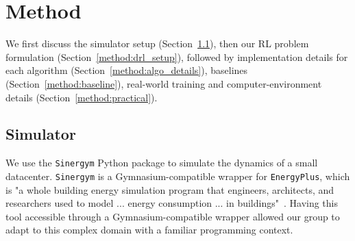\documentclass[12pt]{article}
\begin{document}


\section{Method}

We first discuss the simulator setup (Section~\ref{method:sim}), then our RL problem formulation (Section~\ref{method:drl_setup}), followed by implementation details for each algorithm (Section~\ref{method:algo_details}), baselines (Section~\ref{method:baseline}), real-world training and computer-environment details (Section~\ref{method:practical}).

\subsection{Simulator}\label{method:sim}
We use the \texttt{Sinergym} Python package to simulate the dynamics of a small datacenter. \texttt{Sinergym} is a Gymnasium-compatible wrapper for \texttt{EnergyPlus}, which is "a whole building energy simulation program that engineers, architects, and researchers used to model ... energy consumption ... in buildings"~\cite{energyplus}. Having this tool accessible through a Gymnasium-compatible wrapper allowed our group to adapt to this complex domain with a familiar programming context. 
\end{document}
